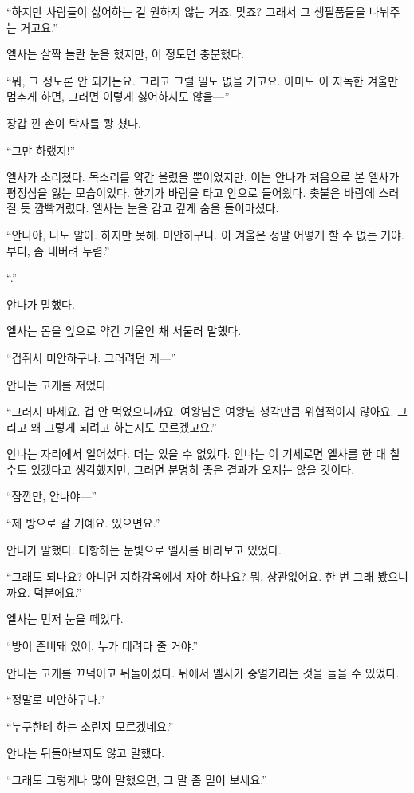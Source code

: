 ``하지만 사람들이 싫어하는 걸 원하지 않는 거죠, 맞죠? 그래서 그 생필품들을 나눠주는 거고요.''

엘사는 살짝 놀란 눈을 했지만, 이 정도면 충분했다.

``뭐, 그 정도론 안 되거든요. 그리고 그럴 일도 없을 거고요. 아마도 이 지독한 겨울만 멈추게 하면, 그러면 이렇게 싫어하지도 않을—''

장갑 낀 손이 탁자를 쾅 쳤다.

``그만 하랬지!''

엘사가 소리쳤다. 목소리를 약간 올렸을 뿐이었지만, 이는 안나가 처음으로 본 엘사가 평정심을 잃는 모습이었다. 한기가 바람을 타고 안으로 들어왔다. 촛불은 바람에 스러질 듯 깜빡거렸다. 엘사는 눈을 감고 깊게 숨을 들이마셨다.

``안나야, 나도 알아. 하지만 못해. 미안하구나. 이 겨울은 정말 어떻게 할 수 없는 거야. 부디, 좀 내버려 두렴.''

``.''

안나가 말했다.

엘사는 몸을 앞으로 약간 기울인 채 서둘러 말했다.

``겁줘서 미안하구나. 그러려던 게—''

안나는 고개를 저었다.

``그러지 마세요. 겁 안 먹었으니까요. 여왕님은 여왕님 생각만큼 위협적이지 않아요. 그리고 왜 그렇게 되려고 하는지도 모르겠고요.''

안나는 자리에서 일어섰다. 더는 있을 수 없었다. 안나는 이 기세로면 엘사를 한 대 칠 수도 있겠다고 생각했지만, 그러면 분명히 좋은 결과가 오지는 않을 것이다.

``잠깐만, 안나야—''

``제 방으로 갈 거예요. 있으면요.''

안나가 말했다. 대항하는 눈빛으로 엘사를 바라보고 있었다.

``그래도 되나요? 아니면 지하감옥에서 자야 하나요? 뭐, 상관없어요. 한 번 그래 봤으니까요. 덕분에요.''

엘사는 먼저 눈을 떼었다.

``방이 준비돼 있어. 누가 데려다 줄 거야.''

안나는 고개를 끄덕이고 뒤돌아섰다. 뒤에서 엘사가 중얼거리는 것을 들을 수 있었다.

``정말로 미안하구나.''

``누구한테 하는 소린지 모르겠네요.''

안나는 뒤돌아보지도 않고 말했다.

``그래도 그렇게나 많이 말했으면, 그 말 좀 믿어 보세요.''

